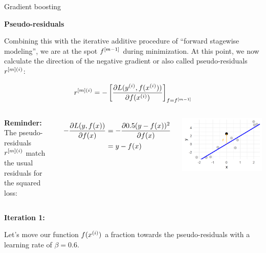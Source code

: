 \begin{vbframe}{Gradient boosting}
\begin{footnotesize}
\textbf{Pseudo-residuals}

\vspace*{0.2cm}
Combining this with the iterative additive procedure
of \enquote{forward stagewise modeling}, we are at the spot $f^{[m-1]}$ during minimization.
At this point, we now calculate the direction of the negative gradient or also called pseudo-residuals $r^{[m](i)}$:

$$ r^{[m](i)} = -\left[\frac{\partial L(y^{(i)}, f(x^{(i)}))}{\partial f(x^{(i)})}\right]_{f=f^{[m-1]}} $$

\lz

\begin{columns}
\column{5cm}
\textbf{Reminder:} The pseudo-residuals $r^{[m](i)}$ match the usual residuals for the squared loss:


\begin{align*}
- \frac{\partial L(y, f(x))}{\partial f(x)} & = - \frac{\partial 0.5(y - f(x))^2}{\partial f(x)}\\ 
                 & = y - f(x)
\end{align*}

\column{5cm}
\begin{center}
  \includegraphics[width=1\textwidth]{figure/pseudo_residual_1.png}
\end{center}

\end{columns}
\end{footnotesize}
\framebreak

\textbf{Iteration 1:}

Let's move our function $f(x^{(i)})$ a fraction towards the pseudo-residuals with a learning rate of $\beta = 0.6$.



\end{vbframe}
